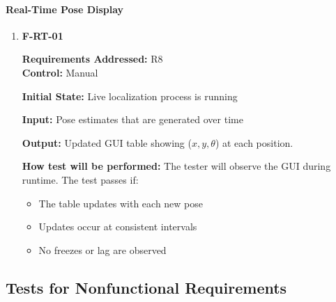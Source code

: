 \documentclass[12pt, titlepage]{article}
\begin{document}
\paragraph{Real-Time Pose Display}

\begin{enumerate}

\item{\textbf{F-RT-01}}

\textbf{Requirements Addressed:} R8\\
\textbf{Control:} Manual
					
\textbf{Initial State: }Live localization process is running 
					
\textbf{Input:} Pose estimates that are generated over time

\textbf{Output:} Updated GUI table showing ($x, y, \theta$) at each position.
					
\textbf{How test will be performed:} The tester will observe the GUI during runtime. The test passes if:
\begin{itemize}
  \item The table updates with each new pose
  \item Updates occur at consistent intervals
  \item No freezes or lag are observed
\end{itemize}

\end{enumerate}

\subsection{Tests for Nonfunctional Requirements}



\end{document}
